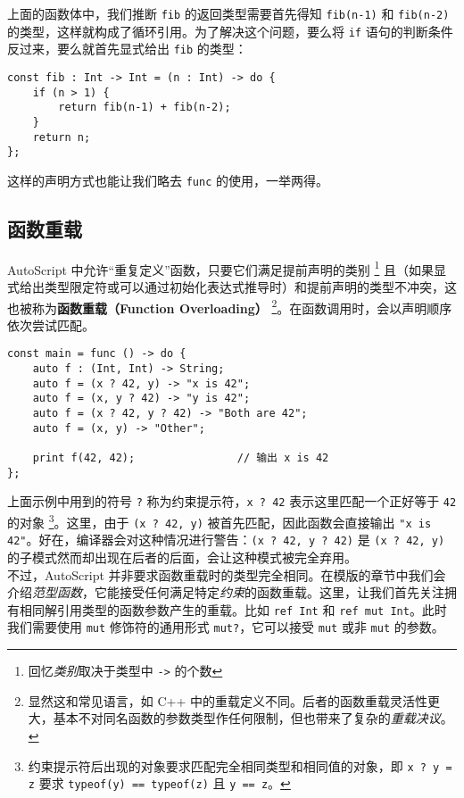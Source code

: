 上面的函数体中，我们推断 \lstinline!fib! 的返回类型需要首先得知 \lstinline!fib(n-1)! 和 \lstinline!fib(n-2)! 的类型，这样就构成了循环引用。为了解决这个问题，要么将 \lstinline!if! 语句的判断条件反过来，要么就首先显式给出 \lstinline!fib! 的类型：

\begin{lstlisting}
const fib : Int -> Int = (n : Int) -> do {
    if (n > 1) {
        return fib(n-1) + fib(n-2);
    }
    return n;
};
\end{lstlisting}

这样的声明方式也能让我们略去 \lstinline!func! 的使用，一举两得。

\subsection{函数重载}

AutoScript 中允许“重复定义”函数，只要它们满足提前声明的类别 \footnote{回忆\emph{类别}取决于类型中 \lstinline!->! 的个数} 且（如果显式给出类型限定符或可以通过初始化表达式推导时）和提前声明的类型不冲突，这也被称为\textbf{函数重载（Function Overloading）} \footnote{显然这和常见语言，如 C++ 中的重载定义不同。后者的函数重载灵活性更大，基本不对同名函数的参数类型作任何限制，但也带来了复杂的\emph{重载决议}。}。在函数调用时，会以声明顺序依次尝试匹配。

\begin{lstlisting}
const main = func () -> do {
    auto f : (Int, Int) -> String;
    auto f = (x ? 42, y) -> "x is 42";
    auto f = (x, y ? 42) -> "y is 42";
    auto f = (x ? 42, y ? 42) -> "Both are 42";
    auto f = (x, y) -> "Other";

    print f(42, 42);                // 输出 x is 42
};
\end{lstlisting}

上面示例中用到的符号 \lstinline!?! 称为约束提示符，\lstinline!x ? 42! 表示这里匹配一个正好等于 \lstinline!42! 的对象 \footnote{约束提示符后出现的对象要求匹配完全相同类型和相同值的对象，即 \lstinline!x ? y = z! 要求 \lstinline!typeof(y) == typeof(z)! 且 \lstinline!y == z!。}。这里，由于 \lstinline!(x ? 42, y)! 被首先匹配，因此函数会直接输出 \lstinline!"x is 42"!。好在，编译器会对这种情况进行警告：\lstinline!(x ? 42, y ? 42)! 是 \lstinline!(x ? 42, y)! 的子模式然而却出现在后者的后面，会让这种模式被完全弃用。 \\

不过，AutoScript 并非要求函数重载时的类型完全相同。在模版的章节中我们会介绍\emph{范型函数}，它能接受任何满足特定\emph{约束}的函数重载。这里，让我们首先关注拥有相同解引用类型的函数参数产生的重载。比如 \lstinline!ref Int! 和 \lstinline!ref mut Int!。此时我们需要使用 \lstinline!mut! 修饰符的通用形式 \lstinline!mut?!，它可以接受 \lstinline!mut! 或非 \lstinline!mut! 的参数。

